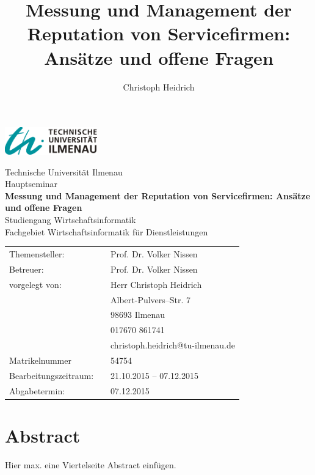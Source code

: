 \documentclass[a4paper,oneside,12pt]{scrreprt}
\title{Messung und Management der Reputation von Servicefirmen: Ansätze und offene Fragen}
\author{Christoph Heidrich}
\begin{document}
\begin{flushright}
\includegraphics[width=0.3\textwidth]{TUI.png}\\[1cm]   
\end{flushright}
\vspace*{1cm}

\begin{center}
\thispagestyle{empty}
\large{Technische Universität Ilmenau}\\
\vspace{0.5 cm}
\Large{Hauptseminar}\\
\vspace{0.5 cm}
\Huge{\textbf{Messung und Management der Reputation von Servicefirmen: Ansätze und offene Fragen}}\\
\vspace{1 cm}
\large{Studiengang Wirtschaftsinformatik}\\
\normalsize{Fachgebiet Wirtschaftsinformatik für Dienstleistungen}\\
\end{center}
\vspace{2cm}

\begin{tabular}{lcl}
   Themensteller: && Prof. Dr. Volker Nissen \\ 
   Betreuer: && Prof. Dr. Volker Nissen \\ 
   vorgelegt von: && Herr Christoph Heidrich \\ 
    && Albert-Pulvers--Str. 7 \\ 
    && 98693 Ilmenau \\
    && 017670 861741 \\
    && christoph.heidrich@tu-ilmenau.de \\
    Matrikelnummer && 54754 \\
    Bearbeitungszeitraum:&&   21.10.2015 -- 07.12.2015\\
    Abgabetermin: && 07.12.2015 \\
 \end{tabular}
 
\chapter*{Abstract}
Hier max. eine Viertelseite Abstract einfügen.
\enlargethispage{\baselineskip}
\thispagestyle{empty}
\newpage
\setcounter{page}{1}
\tableofcontents
\newpage
{}
\listoffigures
\newpage
{}
\listoftables
\newpage
\end{document}

